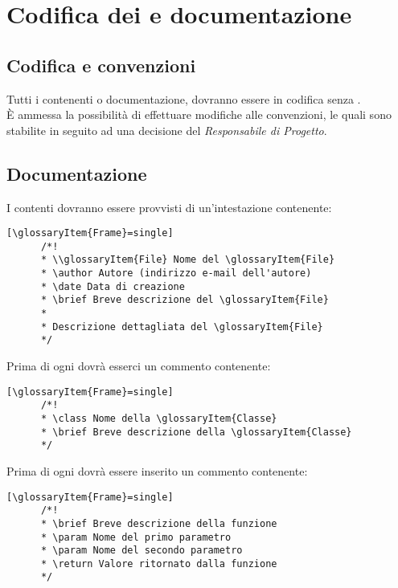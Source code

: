 \section{Codifica dei  e documentazione}
  \subsection{Codifica e convenzioni}
  Tutti i  contenenti  o documentazione, dovranno essere in codifica  senza .\\
  È ammessa la possibilità di effettuare modifiche alle convenzioni, le quali sono stabilite in seguito ad una decisione del \emph{Responsabile di Progetto}.\\

  \subsection{Documentazione}
    I  contenti  dovranno essere provvisti di un'intestazione contenente:
    \begin{lstlisting}[\glossaryItem{Frame}=single]
      /*!
      * \\glossaryItem{File} Nome del \glossaryItem{File}
      * \author Autore (indirizzo e-mail dell'autore)
      * \date Data di creazione
      * \brief Breve descrizione del \glossaryItem{File}
      *
      * Descrizione dettagliata del \glossaryItem{File}
      */
    \end{lstlisting}
    Prima di ogni  dovrà esserci un commento contenente:
    \begin{lstlisting}[\glossaryItem{Frame}=single]
      /*!
      * \class Nome della \glossaryItem{Classe}
      * \brief Breve descrizione della \glossaryItem{Classe}
      */
    \end{lstlisting}
    Prima di ogni  dovrà essere inserito un commento contenente:
    \begin{lstlisting}[\glossaryItem{Frame}=single]
      /*!
      * \brief Breve descrizione della funzione
      * \param Nome del primo parametro
      * \param Nome del secondo parametro
      * \return Valore ritornato dalla funzione
      */
    \end{lstlisting}
